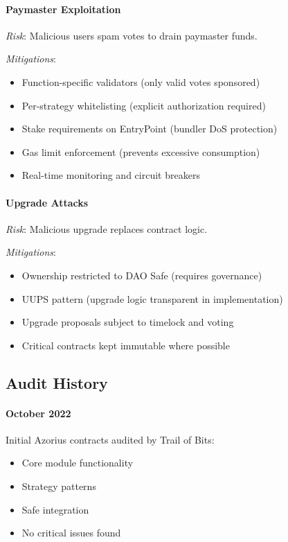 \documentclass[11pt,a4paper]{article}
\begin{document}
\paragraph{Paymaster Exploitation}

\textit{Risk}: Malicious users spam votes to drain paymaster funds.

\textit{Mitigations}:
\begin{itemize}
    \item Function-specific validators (only valid votes sponsored)
    \item Per-strategy whitelisting (explicit authorization required)
    \item Stake requirements on EntryPoint (bundler DoS protection)
    \item Gas limit enforcement (prevents excessive consumption)
    \item Real-time monitoring and circuit breakers
\end{itemize}

\paragraph{Upgrade Attacks}

\textit{Risk}: Malicious upgrade replaces contract logic.

\textit{Mitigations}:
\begin{itemize}
    \item Ownership restricted to DAO Safe (requires governance)
    \item UUPS pattern (upgrade logic transparent in implementation)
    \item Upgrade proposals subject to timelock and voting
    \item Critical contracts kept immutable where possible
\end{itemize}

\subsection{Audit History}

\paragraph{October 2022} Initial Azorius contracts audited by Trail of Bits:
\begin{itemize}
    \item Core module functionality
    \item Strategy patterns
    \item Safe integration
    \item No critical issues found
\end{itemize}
\end{document}
